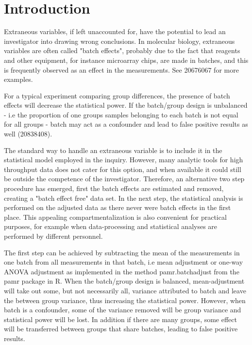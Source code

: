 \documentclass{bio}
\begin{document}
\section{Introduction}\label{intro}

Extraneous variables, if left unaccounted for, have the potential to lead an investigator into drawing wrong conclusions. In molecular biology, extraneous variables are often called "batch effects", probably due to the fact that reagents and other equipment, for instance microarray chips, are made in batches, and this is frequently observed as an effect in the measurements. See 20676067 for more examples. 

For a typical experiment comparing group differences, the presence of batch effects will decrease the statistical power. If the batch/group design is unbalanced - i.e the proportion of one groups samples belonging to each batch is not equal for all groups - batch may act as a confounder and lead to false positive results as well (20838408).

The standard way to handle an extraneous variable is to include it in the statistical model employed in the inquiry. However, many analytic tools for high throughput data does not cater for this option, and when available it could still be outside the competence of the investigator. Therefore, an alternative two step procedure has emerged, first the batch effects are estimated and removed, creating a "batch effect free" data set. In the next step, the statistical analysis is performed on the adjusted data as there never were batch effects in the first place. This appealing compartmentalization is also convenient for practical purposes, for example when data-processing and statistical analyses are performed by different personnel.

The first step can be achieved by subtracting the mean of the measurements in one batch from all measurements in that batch, i.e mean adjustment or one-way ANOVA adjustment as implemented in the method pamr.batchadjust from the pamr package in R. When the batch/group design is balanced, mean-adjustment will take out some, but not necessarily all, variance attributed to batch and leave the between group variance, thus increasing the statistical power. However, when batch is a confounder, some of the variance removed will be group variance and statistical power will be lost. In addition if there are many groups, some effect will be transferred between groups that share batches, leading to false positive results. 
\end{document}
